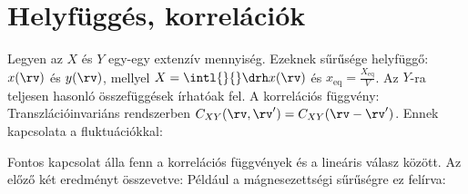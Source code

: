  \section{Helyfüggés, korrelációk}
  
  Legyen az $X$ és $Y$ egy-egy extenzív mennyiség.
   Ezeknek sűrűsége helyfüggő: $x(\rv)$ és $y(\rv)$, mellyel $X=\intl{}{}\drh x(\rv)$ és $x_\text{eq}=\frac{X_\text{eq}}{V}$.
   Az $Y$-ra teljesen hasonló összefüggések írhatóak fel.
   A korrelációs függvény:
  Transzlációinvariáns rendszerben $C_{XY}(\rv,\rv')=C_{XY}(\rv-\rv')$.
   Ennek kapcsolata a fluktuációkkal:
  
  Fontos kapcsolat álla fenn a korrelációs függvények és a lineáris válasz között.
   Az előző két eredményt összevetve:
  Például a mágnesezettségi sűrűségre ez felírva:
